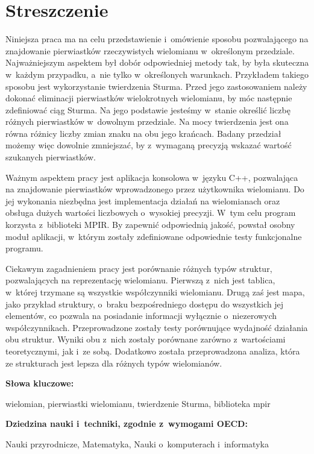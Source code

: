 \chapter*{Streszczenie}
\indent
Niniejsza praca ma na celu przedstawienie i~omówienie sposobu pozwalającego na znajdowanie pierwiastków rzeczywistych wielomianu w~określonym przedziale. Najważniejszym aspektem był dobór odpowiedniej metody tak, by była skuteczna w~każdym przypadku, a~nie tylko w~określonych warunkach. Przykładem takiego sposobu jest wykorzystanie twierdzenia Sturma. Przed jego zastosowaniem należy dokonać eliminacji pierwiastków wielokrotnych wielomianu, by móc następnie zdefiniować ciąg Sturma. Na jego podstawie jesteśmy w~stanie określić liczbę różnych pierwiastków w~dowolnym przedziale.  Na mocy twierdzenia jest ona równa różnicy liczby zmian znaku na obu jego krańcach. Badany przedział możemy więc dowolnie zmniejszać, by z~wymaganą precyzją wskazać wartość szukanych pierwiastków.

Ważnym aspektem pracy jest aplikacja konsolowa w~języku C++, pozwalająca na znajdowanie pierwiastków wprowadzonego przez użytkownika wielomianu. Do jej wykonania niezbędna jest implementacja działań na wielomianach oraz obsługa dużych wartości liczbowych o~wysokiej precyzji. W~tym celu program korzysta z~biblioteki MPIR. By zapewnić odpowiednią jakość, powstał osobny moduł aplikacji, w~którym zostały zdefiniowane odpowiednie testy funkcjonalne programu.

Ciekawym zagadnieniem pracy jest porównanie różnych typów struktur, pozwalających na reprezentację wielomianu. Pierwszą z~nich jest tablica, w~której trzymane są wszystkie współczynniki wielomianu. Drugą zaś jest mapa, jako przykład struktury, o~braku bezpośredniego dostępu do wszystkich jej elementów, co pozwala na posiadanie informacji wyłącznie o~niezerowych współczynnikach. Przeprowadzone zostały testy porównujące wydajność działania obu struktur. Wyniki obu z~nich zostały porównane zarówno z~wartościami teoretycznymi, jak i~ze sobą. Dodatkowo została przeprowadzona analiza, która ze strukturach jest lepsza dla różnych typów wielomianów.

\vspace{12pt}
\noindent\textbf{Słowa kluczowe:}

wielomian, pierwiastki wielomianu, twierdzenie Sturma, biblioteka mpir

\vspace{12pt}
\noindent\textbf{Dziedzina nauki i~techniki, zgodnie z~wymogami OECD:}

Nauki przyrodnicze, Matematyka, Nauki o~komputerach i~informatyka
